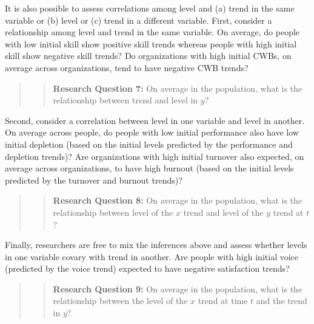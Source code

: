 \documentclass[english,,man]{apa6}
\begin{document}
It is also possible to assess correlations among level and (a) trend in the same variable or (b) level or (c) trend in a different variable. First, consider a relationship among level and trend in the same variable. On average, do people with low initial skill show positive skill trends whereas people with high initial skill show negative skill trends? Do organizations with high initial CWBs, on average across organizations, tend to have negative CWB trends?

\begin{quote}
\begin{quote}
\textbf{Research Question 7:} On average in the population, what is the relationship between trend and level in \(y\)?
\end{quote}
\end{quote}

Second, consider a correlation between level in one variable and level in another. On average across people, do people with low initial performance also have low initial depletion (based on the initial levels predicted by the performance and depletion trends)? Are organizations with high initial turnover also expected, on average across organizations, to have high burnout (based on the initial levels predicted by the turnover and burnout trends)?

\begin{quote}
\begin{quote}
\textbf{Research Question 8:} On average in the population, what is the relationship between level of the \(x\) trend and level of the \(y\) trend at \(t\)?
\end{quote}
\end{quote}

Finally, researchers are free to mix the inferences above and assess whether levels in one variable covary with trend in another. Are people with high initial voice (predicted by the voice trend) expected to have negative satisfaction trends?

\begin{quote}
\begin{quote}
\textbf{Research Question 9:} On average in the population, what is the relationship between the level of the \(x\) trend at time \(t\) and the trend in \(y\)?
\end{quote}
\end{quote}
\end{document}
